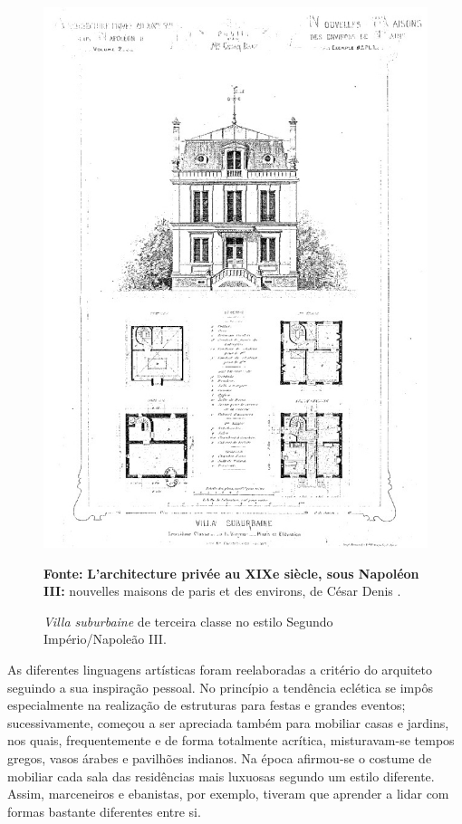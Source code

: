 \begin{figure}[!htp]
\centering
\caption{\textit{Villa suburbaine} de terceira classe no estilo Segundo Império/Napoleão III.}
\includegraphics[width=1\textwidth]{2-cap1/complementos/fotos/daly03-8.JPEG}{\par \footnotesize \textbf{Fonte:} \textbf{L’architecture privée au XIXe siècle, sous Napoléon III:} nouvelles maisons de paris et des environs, de César Denis . \par}
\label{fig:villaterclas} 
\end{figure}

As diferentes linguagens artísticas foram reelaboradas a critério do arquiteto seguindo a sua inspiração pessoal. No princípio a tendência eclética se impôs especialmente na realização de estruturas para festas e grandes eventos; sucessivamente, começou a ser apreciada também para mobiliar casas e jardins, nos quais, frequentemente e de forma totalmente acrítica, misturavam-se tempos gregos, vasos árabes e pavilhões indianos. Na época afirmou-se o costume de mobiliar cada sala das residências mais luxuosas segundo um estilo diferente. Assim, marceneiros e ebanistas, por exemplo, tiveram que aprender a lidar com formas bastante diferentes entre si. 

